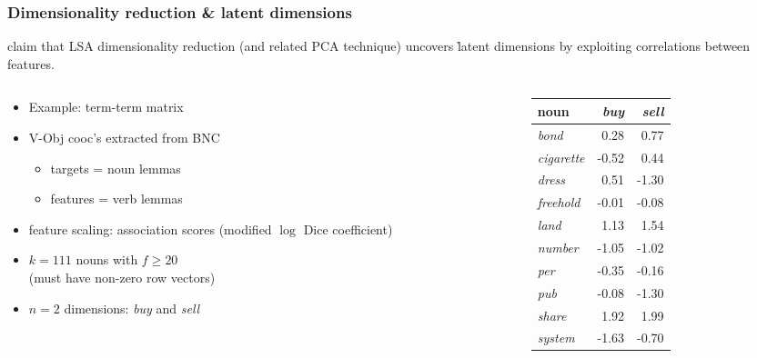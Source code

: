 \begin{frame}
  \frametitle{Dimensionality reduction \& latent dimensions}

  \citet{Landauer:Dumais:97} claim that LSA dimensionality reduction (and related PCA technique) uncovers \h{latent dimensions} by exploiting correlations between features.

  \begin{columns}
    \begin{column}{6.5cm}
      \begin{itemize}
      \item Example: term-term matrix
      \item V-Obj cooc's extracted from BNC
        \begin{itemize}
        \item targets = noun lemmas\\
        \item features = verb lemmas
        \end{itemize}
      \item feature scaling: association scores (modified $\log$ Dice
        coefficient)
      \item $k=111$ nouns with $f \geq 20$\\
        (must have non-zero row vectors)
      \item $n=2$ dimensions: \emph{buy} and \emph{sell}
      \end{itemize}
    \end{column}
    \begin{column}{4cm}
      \begin{center}\footnotesize
        \begin{tabular}{l|rr}
          noun & \emph{buy} & \emph{sell} \\
          \hline
          \emph{bond}      &  0.28 &  0.77\\
          \emph{cigarette} & -0.52 &  0.44\\
          \emph{dress}     &  0.51 & -1.30\\
          \emph{freehold}  & -0.01 & -0.08\\
          \emph{land}      &  1.13 &  1.54\\
          \emph{number}    & -1.05 & -1.02\\
          \emph{per}       & -0.35 & -0.16\\
          \emph{pub}       & -0.08 & -1.30\\
          \emph{share}     &  1.92 &  1.99\\
          \emph{system}    & -1.63 & -0.70
        \end{tabular}
      \end{center}
    \end{column}
  \end{columns}
\end{frame}

